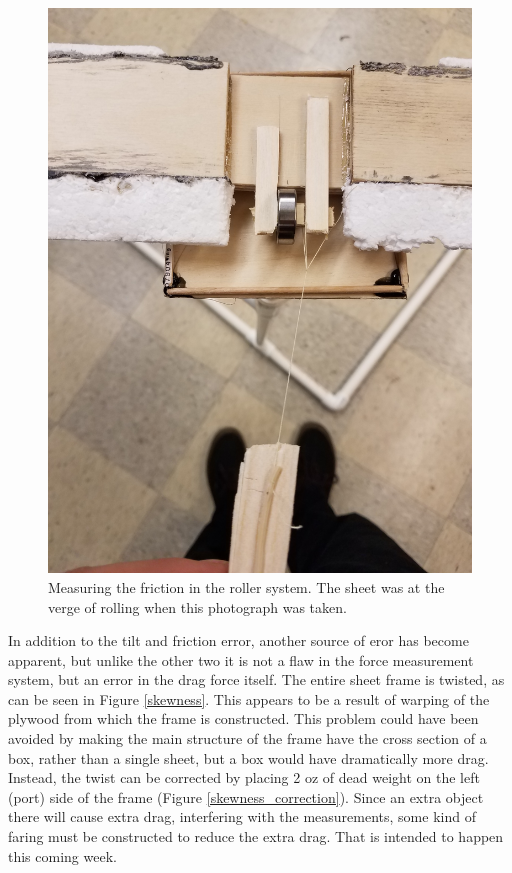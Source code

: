 \documentclass[12pt]{report} %
\begin{document}
\begin{figure}
\includegraphics[width = 0.7\linewidth]{sensitivity.jpg}
\centering
\caption{Measuring the friction in the roller system. The sheet was at the verge of rolling when this photograph was taken.}
\label{friction}
\end{figure}

In addition to the tilt and friction error, another source of eror has become apparent, but unlike the other two it is not
a flaw in the force measurement system, but an error in the drag force itself. The entire sheet frame is twisted, as can be
seen in Figure \ref{skewness}. This appears to be a result of warping of the plywood from which the frame is constructed.
This problem could have been avoided by making the main structure of the frame have the cross section of a box, rather than
a single sheet, but a box would have dramatically more drag. Instead, the twist can be corrected by placing 2 oz of dead weight
on the left (port) side of the frame (Figure \ref{skewness_correction}). Since an extra object there will cause extra drag,
interfering with the measurements,
some kind of faring must be constructed to reduce the extra drag. That is intended to happen this coming week.
\end{document}
